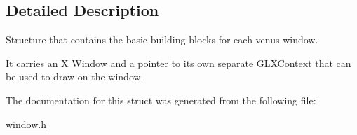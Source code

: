 \subsection{Detailed Description}
Structure that contains the basic building blocks for each venus window. 

It carries an X Window and a pointer to it\textquotesingle{}s own separate G\+L\+X\+Context that can be used to draw on the window. 

The documentation for this struct was generated from the following file\+:\begin{DoxyCompactItemize}
\item 
\hyperlink{window_8h}{window.\+h}\end{DoxyCompactItemize}

